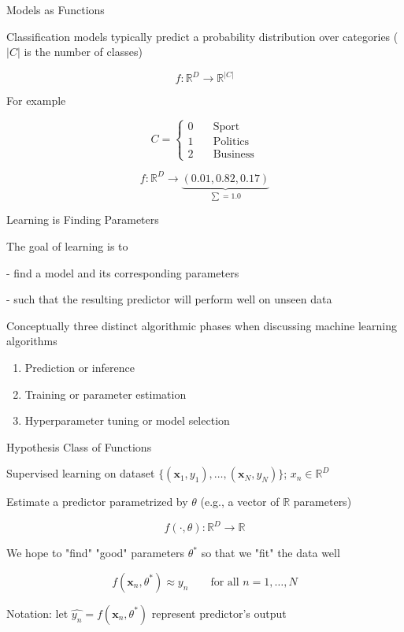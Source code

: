 \documentclass[12pt]{beamer}
\begin{document}
\begin{frame}{Models as Functions}
	
Classification models typically predict a probability distribution over categories ($|C|$ is the number of classes)
	
	$$
	f: \mathbb{R}^{D} \to \mathbb{R}^{|C|}
	$$
	
For example
	
$$
C =
\begin{cases}
0  & \quad \text{Sport}\\
1  & \quad \text{Politics}\\
2  & \quad \text{Business}
\end{cases}
$$
	
$$
f: \mathbb{R}^{D} \to \underbrace{(0.01, 0.82, 0.17)}_{\sum = 1.0}
$$

	
\end{frame}


\begin{frame}{Learning is Finding Parameters}

\begin{block}{The goal of learning is to}

- find a model and its corresponding parameters

- such that the resulting predictor will perform well on unseen data
\end{block}


Conceptually three distinct algorithmic phases when discussing machine learning algorithms

\begin{enumerate}
\item Prediction or inference
\item Training or parameter estimation
\item Hyperparameter tuning or model selection	
\end{enumerate}

\end{frame}

\begin{frame}{Hypothesis Class of Functions}

Supervised learning on dataset $\{(\mathbf{x}_1, y_1), \dots,  (\mathbf{x}_N, y_N)\}$; $x_n \in \mathbb{R}^D$

Estimate a predictor parametrized by $\theta$ (e.g., a vector of $\mathbb{R}$ parameters)

$$
f(\cdot, \theta): \mathbb{R}^D \to \mathbb{R}
$$

We hope to "find" "good" parameters $\theta^*$ so that we "fit" the data well

$$
f(\mathbf{x}_n, \theta^*) \approx y_n \qquad \text{for all } n = 1, \dots, N
$$

Notation: let $\hat{y_n} = f(\mathbf{x}_n, \theta^*)$ represent predictor's output

\end{frame}
\end{document}
